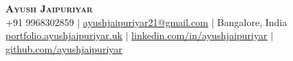 \begin{center}
  \textbf{\Huge \scshape Ayush Jaipuriyar} \\ \vspace{1pt}
  \small
  +91 9968302859 $|$
  \href{mailto:ayushjaipuriyar21@gmail.com}{\underline{ayushjaipuriyar21@gmail.com}} $|$
  Bangalore, India \\
  \href{https://portfolio.ayushjaipuriyar.uk}{\underline{portfolio.ayushjaipuriyar.uk}} $|$
  \href{https://www.linkedin.com/in/ayushjaipuriyar}{\underline{linkedin.com/in/ayushjaipuriyar}} $|$
  \href{https://github.com/ayushjaipuriyar}{\underline{github.com/ayushjaipuriyar}}
\end{center}
